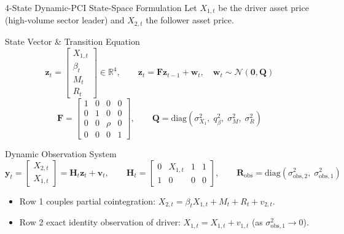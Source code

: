 \documentclass[10pt, aspectratio=169]{beamer}
\newcommand{\R}{\mathbb{R}}
\begin{document}
\begin{frame}{4-State Dynamic-PCI State-Space Formulation}
  Let $X_{1,t}$ be the driver asset price (high-volume sector leader) and $X_{2,t}$ the follower asset price.
  \vspace{4pt}
  \begin{block}{State Vector \& Transition Equation}
    \[
      \bm{z}_t = \begin{bmatrix} X_{1,t} \\ \beta_t \\ M_t \\ R_t \end{bmatrix} \in \R^4, \qquad
      \bm{z}_t = \bm{F} \bm{z}_{t-1} + \bm{w}_t, \quad \bm{w}_t \sim \mathcal{N}(\bm{0}, \bm{Q})
    \]
    \[
      \bm{F} = \begin{bmatrix} 1 & 0 & 0 & 0 \\ 0 & 1 & 0 & 0 \\ 0 & 0 & \rho & 0 \\ 0 & 0 & 0 & 1 \end{bmatrix}, \qquad
      \bm{Q} = \text{diag}\left(\sigma_{X_1}^2, \; q_\beta^2, \; \sigma_M^2, \; \sigma_R^2\right)
    \]
  \end{block}
  \begin{block}{Dynamic Observation System}
    \[
      \bm{y}_t = \begin{bmatrix} X_{2,t} \\ X_{1,t} \end{bmatrix} = \bm{H}_t \bm{z}_t + \bm{v}_t, \qquad
      \bm{H}_t = \begin{bmatrix} 0 & X_{1,t} & 1 & 1 \\ 1 & 0 & 0 & 0 \end{bmatrix}, \qquad
      \bm{R}_{\text{obs}} = \text{diag}\left(\sigma_{\text{obs},2}^2, \; \sigma_{\text{obs},1}^2\right)
    \]
  \end{block}
  \begin{itemize}
    \item Row 1 couples partial cointegration: $X_{2,t} = \beta_t X_{1,t} + M_t + R_t + v_{2,t}$.
    \item Row 2 exact identity observation of driver: $X_{1,t} = X_{1,t} + v_{1,t}$ (as $\sigma_{\text{obs},1}^2 \to 0$).
  \end{itemize}
\end{frame}
\end{document}
